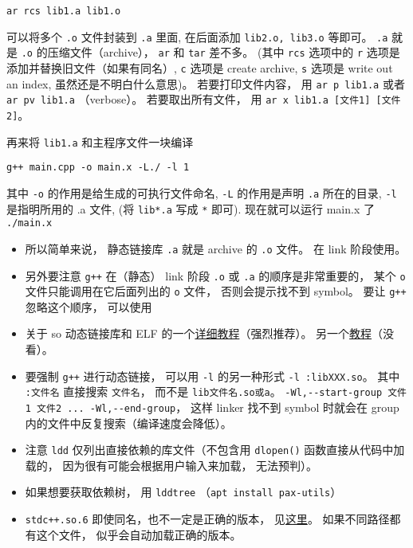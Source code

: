 \begin{lstlisting}[language=none]
ar rcs lib1.a lib1.o
\end{lstlisting}
可以将多个 \verb`.o` 文件封装到 \verb`.a` 里面, 在后面添加 \verb`lib2.o, lib3.o` 等即可。 \verb`.a` 就是 \verb`.o` 的压缩文件（archive）， \verb`ar` 和 \verb`tar` 差不多。 (其中 \verb`rcs` 选项中的 \verb`r` 选项是添加并替换旧文件（如果有同名）, \verb`c` 选项是 create archive, \verb`s` 选项是 write out an index, 虽然还是不明白什么意思)。 若要打印文件内容， 用 \verb`ar p lib1.a` 或者 \verb`ar pv lib1.a` （verbose）。 若要取出所有文件， 用 \verb`ar x lib1.a [文件1] [文件2]`。

再来将 \verb`lib1.a` 和主程序文件一块编译
\begin{lstlisting}[language=none]
g++ main.cpp -o main.x -L./ -l 1
\end{lstlisting}

其中 \verb`-o` 的作用是给生成的可执行文件命名, \verb`-L` 的作用是声明 \verb`.a` 所在的目录, \verb`-l` 是指明所用的 .a 文件, (将 \verb`lib*.a` 写成 \verb`*` 即可).
现在就可以运行 main.x 了
\verb`./main.x`

\begin{itemize}
\item 所以简单来说， 静态链接库 \verb`.a` 就是 archive 的 \verb`.o` 文件。 在 link 阶段使用。
\item 另外要注意 \verb`g++` 在（静态） link 阶段 \verb`.o` 或 \verb`.a` 的顺序是非常重要的， 某个 \verb`o` 文件只能调用在它后面列出的 \verb`o` 文件， 否则会提示找不到 symbol。 要让 \verb`g++` 忽略这个顺序， 可以使用
\item 关于 so 动态链接库和 ELF 的一个\href{https://amir.rachum.com/blog/2016/09/17/shared-libraries/}{详细教程}（强烈推荐）。 另一个\href{https://holtstrom.com/michael/blog/post/446/Shared-Library-Symbol-Conflicts-(on-Solaris).html}{教程}（没看）。
\item 要强制 \verb`g++` 进行动态链接， 可以用 \verb`-l` 的另一种形式 \verb`-l :libXXX.so`。 其中 \verb`:文件名` 直接搜索 \verb`文件名`， 而不是 \verb`lib文件名.so或a`。
\verb`-Wl,--start-group 文件1 文件2 ... -Wl,--end-group`， 这样 linker 找不到 symbol 时就会在 group 内的文件中反复搜索（编译速度会降低）。
\item 注意 \verb`ldd` 仅列出直接依赖的库文件（不包含用 \verb`dlopen()` 函数直接从代码中加载的， 因为很有可能会根据用户输入来加载， 无法预判）。
\item 如果想要获取依赖树， 用 \verb`lddtree` （\verb`apt install pax-utils`）
\item \verb`stdc++.so.6` 即使同名，也不一定是正确的版本， 见\href{https://unix.stackexchange.com/questions/458659/what-do-the-multiple-glibc-versions-mean-in-the-output-of-ldd}{这里}。 如果不同路径都有这个文件， 似乎会自动加载正确的版本。
\end{itemize}

